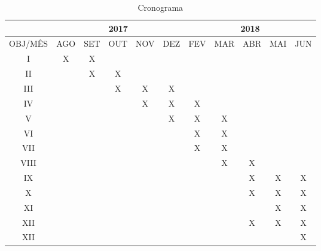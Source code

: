 \begin{table}[h!]
	\centering
	\caption{Cronograma}
	\label{my-label}
	\begin{tabular}{c|c|c|c|c|c|c|c|c|c|c|}
		\cline{2-11}
		& \multicolumn{5}{c|}{2017}   & \multicolumn{5}{c|}{2018}   \\ \hline
		\multicolumn{1}{|c|}{OBJ/MÊS} & AGO & SET & OUT & NOV & DEZ & FEV & MAR & ABR & MAI & JUN \\ \hline
		\multicolumn{1}{|c|}{I}		&X&X& & & & & & & &\\ \hline
		\multicolumn{1}{|c|}{II}	& &X&X& & & & & & &\\ \hline
		\multicolumn{1}{|c|}{III}	& & &X&X&X& & & & &\\ \hline
		\multicolumn{1}{|c|}{IV}	& & & &X&X&X& & & &\\ \hline
		\multicolumn{1}{|c|}{V}		& & & & &X&X&X& & &\\ \hline
		\multicolumn{1}{|c|}{VI}	& & & & & &X&X& & &\\ \hline
		\multicolumn{1}{|c|}{VII}	& & & & & &X&X& & &\\ \hline
		\multicolumn{1}{|c|}{VIII}	& & & & & & &X&X& &\\ \hline
		\multicolumn{1}{|c|}{IX}	& & & & & & & &X&X&X\\ \hline
		\multicolumn{1}{|c|}{X}		& & & & & & & &X&X&X\\ \hline
		\multicolumn{1}{|c|}{XI}	& & & & & & & & &X&X\\ \hline
		\multicolumn{1}{|c|}{XII}	& & & & & & & &X&X&X\\ \hline
		\multicolumn{1}{|c|}{XII}	& & & & & & & & & &X\\ \hline
	\end{tabular}
\end{table}

